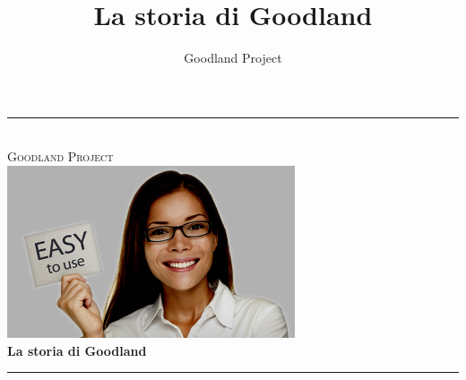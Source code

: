\documentclass[10pt,oneside]{article} %
\author{Goodland Project}
\title{La storia di Goodland}
\begin{document}
\newcommand{\HRule}{\rule{\linewidth}{0.5mm}}
\begin{titlepage}
\begin{center}

\HRule \\[0.3cm]
\textsc{\Large Goodland Project} \\[0.3cm]
\includegraphics[width=8.5cm]{img/coverimg.jpg} \\[0.3cm]
{ \Huge \bfseries La storia di Goodland} \\%
\HRule \\[0.3cm]


\end{center}
\end{titlepage}




\tableofcontents




\end{document}
